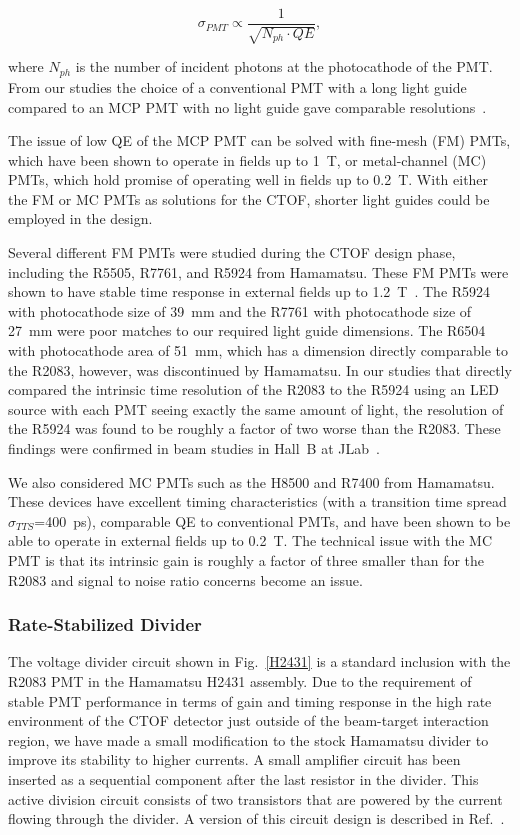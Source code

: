 \documentclass{elsart}
\begin{document}
\begin{equation}
\sigma_{PMT} \propto \frac{1}{\sqrt{N_{ph} \cdot QE}},
\end{equation}

\noindent
where $N_{ph}$ is the number of incident photons at the photocathode of the PMT. From our studies
the choice of a conventional PMT with a long light guide compared to an MCP PMT with no light guide
gave comparable resolutions~\cite{baturin06}.

The issue of low QE of the MCP PMT can be solved with fine-mesh (FM) PMTs, which have been
shown to operate in fields up to 1~T, or metal-channel (MC) PMTs, which hold promise of
operating well in fields up to 0.2~T. With either the FM or MC PMTs as solutions for the CTOF,
shorter light guides could be employed in the design.

Several different FM PMTs were studied during the CTOF design phase, including the R5505,
R7761, and R5924 from Hamamatsu. These FM PMTs were shown to have stable time response
in external fields up to 1.2~T~\cite{bonesini}. The R5924 with photocathode size of 39~mm
and the R7761 with photocathode size of 27~mm were poor matches to our required light guide
dimensions. The R6504 with photocathode area of 51~mm, which has a dimension directly comparable
to the R2083, however, was discontinued by Hamamatsu. In our studies that directly compared
the intrinsic time resolution of the R2083 to the R5924 using an LED source with each PMT
seeing exactly the same amount of light, the resolution of the R5924 was found to be roughly 
a factor of two worse than the R2083. These findings were confirmed in beam studies in
Hall~B at JLab~\cite{baturin11}.

We also considered MC PMTs such as the H8500 and R7400 from Hamamatsu. These devices have
excellent timing characteristics (with a transition time spread $\sigma_{TTS}$=400~ps), 
comparable QE to conventional PMTs, and have been shown to be able to operate in external 
fields up to 0.2~T. The technical issue with the MC PMT is that its intrinsic gain is 
roughly a factor of three smaller than for the R2083 and signal to noise ratio concerns 
become an issue.

\subsubsection{Rate-Stabilized Divider}
\label{divider}

The voltage divider circuit shown in Fig.~\ref{H2431} is a standard inclusion with the
R2083 PMT in the Hamamatsu H2431 assembly. Due to the requirement of stable PMT performance
in terms of gain and timing response in the high rate environment of the CTOF detector
just outside of the beam-target interaction region, we have made a small modification to
the stock Hamamatsu divider to improve its stability to higher currents. A small amplifier 
circuit has been inserted as a sequential component after the last resistor in the divider. 
This active division circuit consists of two transistors that are powered by the current 
flowing through the divider. A version of this circuit design is described in Ref.~\cite{popov}. 
\end{document}
